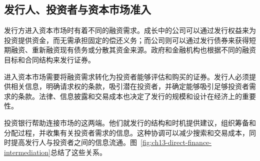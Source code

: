 \subsection{发行人、投资者与资本市场准入}

发行方进入资本市场时有着不同的融资需求。成长中的公司可以通过发行权益来为投资提供资金，而无需承担固定的偿还义务；而公司则可以通过发行债券来获得短期融资、重新融资现有债务或分散其资金来源。政府和金融机构也根据不同的融资目标和合同结构来发行证券。

进入资本市场需要将融资需求转化为投资者能够评估和购买的证券。发行人必须提供相关信息，明确请求权的条款，吸引潜在投资者，并确定能够吸引足够投资者需求的条款。法律、信息披露和交易成本也决定了发行的规模和设计在经济上的重要性。

投资银行帮助连接市场的这两端。他们就发行的结构和时机提供建议，组织筹备和分配过程，并收集有关投资者需求的信息。这种协调可以减少搜索和交易成本，同时提高发行人与投资者之间的信息流通。图~\ref{fig:ch13-direct-finance-intermediation}总结了这些关系。

